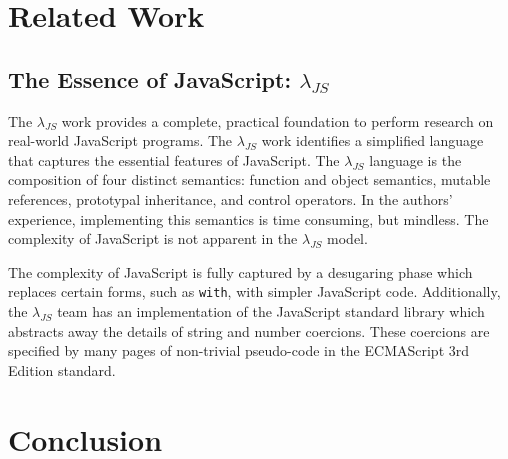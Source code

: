 \documentclass[10pt,letter,english]{article}
\newcommand{\js}[0]{JavaScript}
\newcommand{\lambdajs}[0]{$\lambda_{JS}$}
\begin{document}
\section{Related Work}
\subsection{The Essence of JavaScript: \lambdajs{}}

The \lambdajs{} work provides a complete, practical foundation to perform
research on real-world JavaScript programs. The \lambdajs{} work identifies a
simplified language that captures the essential features of \js{}. The
\lambdajs{} language is the composition of four distinct semantics: function and
object semantics, mutable references, prototypal inheritance, and control
operators. In the authors' experience, implementing this semantics is time
consuming, but mindless. The complexity of \js{} is not apparent in the
\lambdajs{} model.

The complexity of \js{} is fully captured by a desugaring phase which replaces
certain forms, such as \texttt{with}, with simpler \js{} code. Additionally, the
\lambdajs{} team has an implementation of the \js{} standard library which
abstracts away the details of string and number coercions. These coercions are
specified by many pages of non-trivial pseudo-code in the ECMAScript 3rd Edition
standard.

\section{Conclusion}



{}

\end{document}
